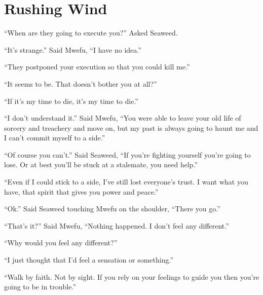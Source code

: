 \section{Rushing Wind}

``When are they going to execute you?'' Asked Seaweed.

``It's strange.'' Said Mwe\-fu, ``I have no idea.''

``They postponed your execution so that you could kill me.''

``It seems to be. That doesn't bother you at all?''

``If it's my time to die, it's my time to die.''

``I don't understand it.'' Said Mwe\-fu, ``You were able to leave your old life of sorcery and treachery and move on, but my past is always going to haunt me and I can't commit myself to a side.''

``Of course you can't.'' Said Seaweed, ``If you're fighting yourself you're going to lose. Or at best you'll be stuck at a stalemate, you need help.''

``Even if I could stick to a side, I've still lost everyone's trust. I want what you have, that spirit that gives you power and peace.''

``Ok.'' Said Seaweed touching Mwe\-fu on the shoulder, ``There you go.''

``That's it?'' Said Mwe\-fu, ``Nothing happened. I don't feel any different.''

``Why would you feel any different?''

``I just thought that I'd feel a sensation or something.''

``Walk by faith. Not by sight. If you rely on your feelings to guide you then you're going to be in trouble.''


